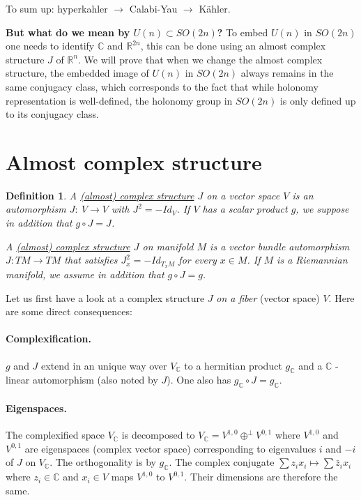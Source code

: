 \documentclass[11pt]{article}
\newtheorem{definition}{Definition}
\begin{document}
To sum up: hyperkahler \(\longrightarrow\) Calabi-Yau \(\longrightarrow\) Kähler.

\textbf{But what do we mean by \(U(n)\subset SO(2n)\)?} To embed \(U(n)\) in \(SO(2n)\) one needs to identify \(\mathbb{C}\) and \(\mathbb{R}^{2n}\), this can be done using an almost complex structure \(J\) of \(\mathbb{R}^n\). We will prove that when we change the almost complex structure, the embedded image of
\(U(n)\) in \(SO(2n)\) always remains in the same conjugacy class, which corresponds to the
fact that while holonomy representation is well-defined, the holonomy group in \(SO(2n)\) is only
defined up to its conjugacy class.

\section*{Almost complex structure}
\label{sec:orgb3181a7}
\begin{definition}
A \uline{(almost) complex structure} \(J\) on a vector space \(V\) is an automorphism \(J:\ V\longrightarrow V\)
with \(J^2 = -Id_V\). If \(V\) has a scalar product \(g\), we suppose in addition that \(g\circ J = J\).

A \uline{(almost) complex structure} \(J\) on manifold \(M\) is a vector bundle automorphism \(J: TM\longrightarrow
TM\) that satisfies \(J_x^2 = -Id_{T_xM}\) for every \(x\in M\). If \(M\) is a Riemannian manifold, we
assume in addition that \(g\circ J = g\).
\end{definition}

Let us first have a look at a complex structure \(J\) \emph{on a fiber} (vector space) \(V\). Here are some
direct consequences:
\paragraph*{Complexification.}
\label{sec:org0ba5072}
\(g\) and \(J\) extend in an unique way over \(V_{ \mathbb{C}}\) to a
hermitian product \(g_{\mathbb{C}}\) and a \(\mathbb{C}\) -linear automorphism (also noted by \(J\)). One
also has \(g_{\mathbb{C}}\circ J = g_{\mathbb{C}}\).

\paragraph*{Eigenspaces.}
\label{sec:orgddbbacf}
The complexified space \(V_{ \mathbb{C}}\) is decomposed to \(V_{\mathbb{C}} =
V^{1,0} \oplus^\perp V^{0,1}\) where \(V^{1,0}\) and \(V^{0,1}\) are eigenspaces (complex vector space)
corresponding to eigenvalues \(i\) and \(-i\) of \(J\) on \(V_{\mathbb{C}}\). The orthogonality is by
\(g_{\mathbb{C}}\). The complex conjugate \(\sum z_i x_i \mapsto \sum \bar z_i x_i\) where \(z_i\in
\mathbb{C}\) and \(x_i\in V\) maps \(V^{1,0}\) to \(V^{0,1}\). Their dimensions are therefore the same.
\end{document}
